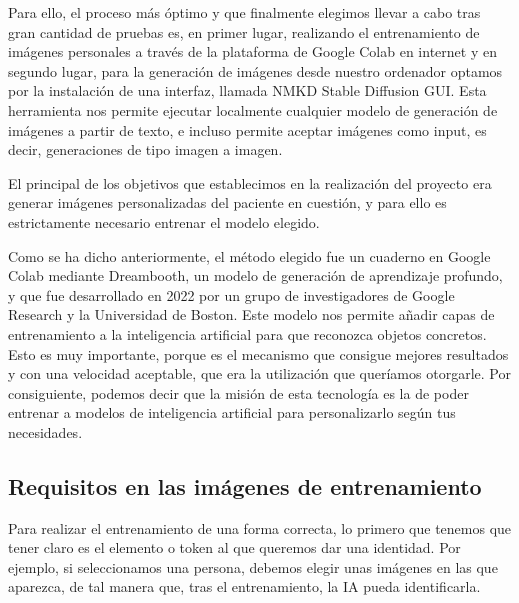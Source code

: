 Para ello, el proceso más óptimo y que finalmente elegimos llevar a cabo tras gran cantidad de pruebas es, en primer lugar, realizando el entrenamiento de imágenes personales a través de la plataforma de Google Colab en internet y en segundo lugar, para la generación de imágenes desde nuestro ordenador optamos por la instalación de una interfaz, llamada NMKD Stable Diffusion GUI. Esta herramienta nos permite ejecutar localmente cualquier modelo de generación de imágenes a partir de texto, e incluso permite aceptar imágenes como input, es decir, generaciones de tipo imagen a imagen. 

El principal de los objetivos que establecimos en la realización del proyecto era generar imágenes personalizadas del paciente en cuestión, y para ello es estrictamente necesario entrenar el modelo elegido.

Como se ha dicho anteriormente, el método elegido fue un cuaderno en Google Colab mediante Dreambooth,  un modelo de generación de aprendizaje profundo, y que fue desarrollado en 2022 por un grupo de investigadores de Google Research y la Universidad de Boston.  Este modelo nos permite añadir capas de entrenamiento a la inteligencia artificial para que reconozca objetos concretos. Esto es muy importante, porque es el mecanismo que consigue mejores resultados y con una velocidad aceptable, que era la utilización que queríamos otorgarle. Por consiguiente, podemos decir que la misión de esta tecnología es la de poder entrenar a modelos de inteligencia artificial para personalizarlo según tus necesidades.

\subsection{Requisitos en las imágenes de entrenamiento}

Para realizar el entrenamiento de una forma correcta, lo primero que tenemos que tener claro es  el elemento o token al que queremos dar una identidad. Por ejemplo, si seleccionamos una persona, debemos elegir unas imágenes en las que aparezca, de tal manera que, tras el entrenamiento, la IA pueda identificarla. 

